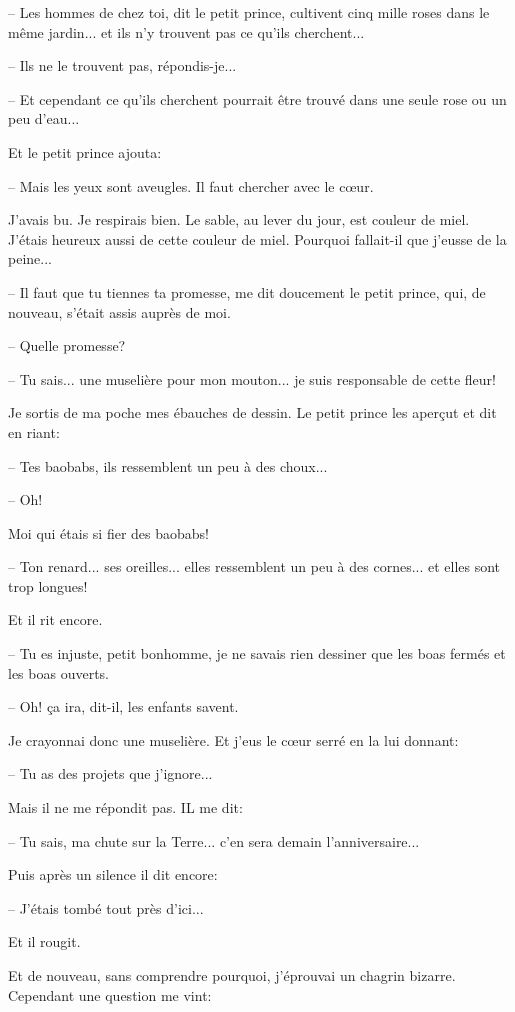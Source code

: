 \documentclass[a4paper]{report}
\begin{document}
-- Les hommes de chez toi, dit le petit prince, cultivent cinq mille roses dans le même jardin... et ils n'y trouvent pas ce qu'ils cherchent...

-- Ils ne le trouvent pas, répondis-je...

-- Et cependant ce qu'ils cherchent pourrait être trouvé dans une seule rose ou un peu d'eau...

Et le petit prince ajouta:

-- Mais les yeux sont aveugles. Il faut chercher avec le cœur.

J'avais bu. Je respirais bien. Le sable, au lever du jour, est couleur de miel. J'étais heureux aussi de cette couleur de miel. Pourquoi fallait-il que j'eusse de la peine...

-- Il faut que tu tiennes ta promesse, me dit doucement le petit prince, qui, de nouveau, s'était assis auprès de moi.

-- Quelle promesse?

-- Tu sais... une muselière pour mon mouton... je suis responsable de cette fleur!

Je sortis de ma poche mes ébauches de dessin. Le petit prince les aperçut et dit en riant:

-- Tes baobabs, ils ressemblent un peu à des choux...

-- Oh!

Moi qui étais si fier des baobabs!

-- Ton renard... ses oreilles... elles ressemblent un peu à des cornes... et elles sont trop longues!

Et il rit encore.

-- Tu es injuste, petit bonhomme, je ne savais rien dessiner que les boas fermés et les boas ouverts.

-- Oh! ça ira, dit-il, les enfants savent.

Je crayonnai donc une muselière. Et j'eus le cœur serré en la lui donnant:

-- Tu as des projets que j'ignore...

Mais il ne me répondit pas. IL me dit:

-- Tu sais, ma chute sur la Terre... c'en sera demain l'anniversaire...

Puis après un silence il dit encore:

-- J'étais tombé tout près d'ici...

Et il rougit.

Et de nouveau, sans comprendre pourquoi, j'éprouvai un chagrin bizarre. Cependant une question me vint:
\end{document}

